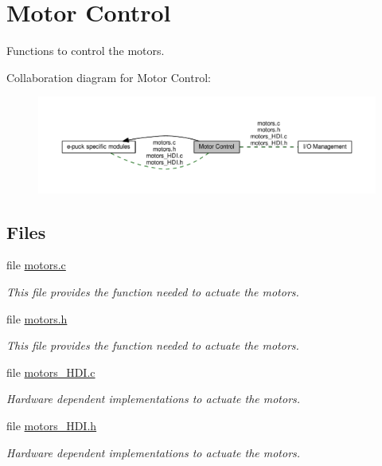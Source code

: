 \hypertarget{group__motors}{}\section{Motor Control}
\label{group__motors}


Functions to control the motors.  


Collaboration diagram for Motor Control\+:\nopagebreak
\begin{figure}[H]
\begin{center}
\leavevmode
\includegraphics[width=350pt]{dd/daa/group__motors}
\end{center}
\end{figure}
\subsection*{Files}
\begin{DoxyCompactItemize}
\item 
file \hyperlink{motors_8c}{motors.\+c}
\begin{DoxyCompactList}\small\item\em This file provides the function needed to actuate the motors. \end{DoxyCompactList}\item 
file \hyperlink{motors_8h}{motors.\+h}
\begin{DoxyCompactList}\small\item\em This file provides the function needed to actuate the motors. \end{DoxyCompactList}\item 
file \hyperlink{motors__HDI_8c}{motors\+\_\+\+H\+D\+I.\+c}
\begin{DoxyCompactList}\small\item\em Hardware dependent implementations to actuate the motors. \end{DoxyCompactList}\item 
file \hyperlink{motors__HDI_8h}{motors\+\_\+\+H\+D\+I.\+h}
\begin{DoxyCompactList}\small\item\em Hardware dependent implementations to actuate the motors. \end{DoxyCompactList}\end{DoxyCompactItemize}


